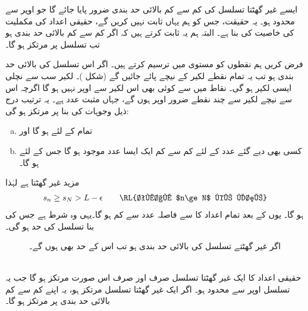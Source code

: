 ایسے غیر گھٹتا تسلسل کی کم سے کم بالائی حد بندی ضرور پایا جائے گا جو اوپر سے محدود ہو۔ یہ حقیقت، جس کو ہم یہاں ثابت نہیں کریں گے، حقیقی اعداد کی مکملیت کی خاصیت کی بنا ہے۔ البتہ ہم یہ ثابت کرتے ہیں کہ اگر  کم سے کم بالائی حد بندی ہو تب  تسلسل  پر مرتکز ہو گا۔

فرض کریں ہم   نقطوں کو  مستوی میں ترسیم کرتے ہیں۔ اگر اس تسلسل کی بالائی حد بندی   ہو تب یہ تمام نقطے لکیر  کے نیچے پائے جائیں گے (شکل )۔ لکیر  سب سے نچلی ایسی لکیر ہو گی۔ نقاط  میں سے کوئی بھی اس لکیر سے اوپر نہیں ہو گا اگرچہ اس سے نیچے لکیر  سے چند نقطے  ضرور اوپر  ہوں گے، جہاں  مثبت عدد ہے۔ یہ ترتیب درج ذیل وجوہات کی بنا  پر مرتکز ہو گی:
\begin{enumerate}[a.]
\item
تمام  کے لئے  ہو گا اور
\item
کسی بھی دیے گئے عدد  کے لئے کم سے کم ایک ایسا عدد  موجود ہو گا جس کے لئے  ہو گا۔
\end{enumerate}
مزید  غیر گھٹتا ہے لہٰذا
\begin{align*} 
s_n\ge s_N>L-\epsilon\quad\quad  \text{\RL{تمام $n\ge N$ کے لئے}}
\end{align*}
ہو گا۔ یوں  کے بعد تمام اعداد  کا  سے فاصلہ عدد  سے کم ہو گا۔یہی وہ شرط ہے جس کی بنا تسلسل  کی حد  ہو گی۔
\begin{figure}
\centering
{}
\caption{اگر غیر گھٹتے تسلسل کی بالائی حد بندی  ہو تب اس کے حد  بھی ہوں گے۔}
\label{شکل_تسلسل_بالائی_حد_بندی_اور_حد}
\end{figure}

\\
حقیقی اعداد کا ایک غیر گھٹتا تسلسل صرف اور صرف اس صورت مرتکز ہو گا جب یہ تسلسل اوپر سے محدود ہو۔ اگر ایک غیر گھٹتا تسلسل مرتکز ہو، یہ اپنے کم سے کم بالائی حد بندی پر مرتکز ہو گا۔

